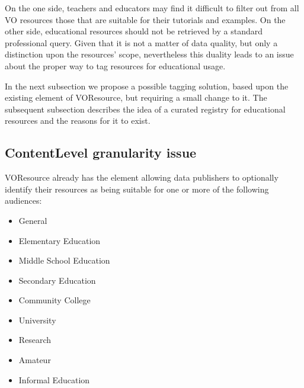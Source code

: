\documentclass{ivoa}
\begin{document}
\label{sect:eduvspro}


On the one side, teachers and educators may find it difficult to filter out 
from all VO resources those that are suitable for their tutorials and
examples. On the other side, educational resources should not be retrieved 
by a standard professional query.
Given that it is not a matter of data quality, but only a distinction upon 
the resources' scope, nevertheless this duality leads to an issue about the
proper way to tag resources for educational usage.
  


In the next subsection we propose a possible tagging solution, based upon 
the existing 
element of VOResource, but requiring a small change
to it. The subsequent subsection describes the idea of a
curated registry for educational resources and the reasons for it to exist.
  


\subsection{ContentLevel granularity issue}

\label{sect:contentlvl}

VOResource already has the 
element
allowing data publishers to optionally identify their resources as being 
suitable for one or more of the following audiences:


\begin{itemize}

\item General{}

\item Elementary Education{}

\item Middle School Education{}

\item Secondary Education{}

\item Community College{}

\item University{}

\item Research{}

\item Amateur{}

\item Informal Education{}

\end{itemize}
\end{document}
